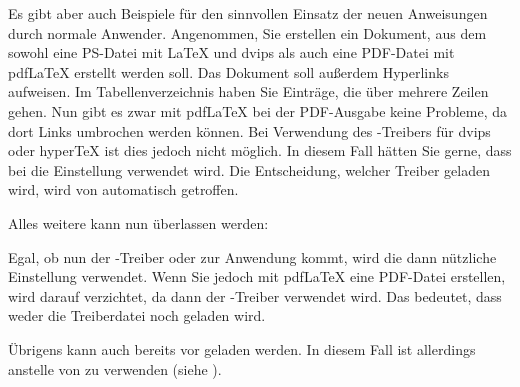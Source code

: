 \begin{Example}
  Es gibt aber auch Beispiele für den sinnvollen Einsatz der neuen
  Anweisungen durch normale Anwender. Angenommen, Sie erstellen ein
  Dokument, aus dem sowohl eine PS-Datei mit \LaTeX{} und dvips als auch
  eine PDF-Datei mit \mbox{pdf\LaTeX} erstellt werden soll. Das Dokument soll
  außerdem Hyperlinks aufweisen. Im Tabellenverzeichnis haben Sie
  Einträge, die über mehrere Zeilen gehen. Nun gibt es zwar mit
  \mbox{pdf\LaTeX} bei der PDF-Ausgabe keine Probleme, da dort Links
  umbrochen werden können. Bei Verwendung des
  -Treibers für dvips oder
  \mbox{hyper\TeX} ist dies jedoch nicht
  möglich. In diesem Fall hätten Sie gerne, dass bei
   die Einstellung  verwendet
  wird. Die Entscheidung, welcher Treiber geladen wird, wird von
   automatisch getroffen.

  Alles weitere kann nun  überlassen werden:
  Egal, ob nun der -Treiber  oder
   zur Anwendung kommt, wird die dann nützliche Einstellung
   verwendet. Wenn Sie jedoch mit \mbox{pdf\LaTeX} eine
  PDF-Datei erstellen, wird darauf verzichtet, da dann der
  -Treiber  verwendet wird. Das bedeutet,
  dass weder die Treiberdatei  noch 
  geladen wird.
\end{Example}
\iffalse%
Übrigens\textnote{Tipp!} können Sie das Laden von \Package{scrlfile} und die
obigen Anweisungen \DescRef{\LabelBase.cmd.AfterFile} auch in Ihre private
\File{hyperref.cfg} (siehe oben) einfügen. Verwenden Sie dabei jedoch zum
Laden des Pakets besser \Macro{RequirePackage} anstelle von
\Macro{usepackage} (siehe \cite{latex:clsguide}). Die neuen Zeilen müssen in
obigem Beispiel unmittelbar nach der \Macro{ProvidesFile}-Zeile, also
unbedingt vor der Ausführung der Optionen \Option{dvips} oder \Option{pdftex},
eingefügt werden.%
\fi%
Übrigens kann  auch bereits vor
 geladen werden. In
diesem Fall ist allerdings 
anstelle von  zu verwenden (siehe
\cite{latex:clsguide}).%
\EndIndexGroup



